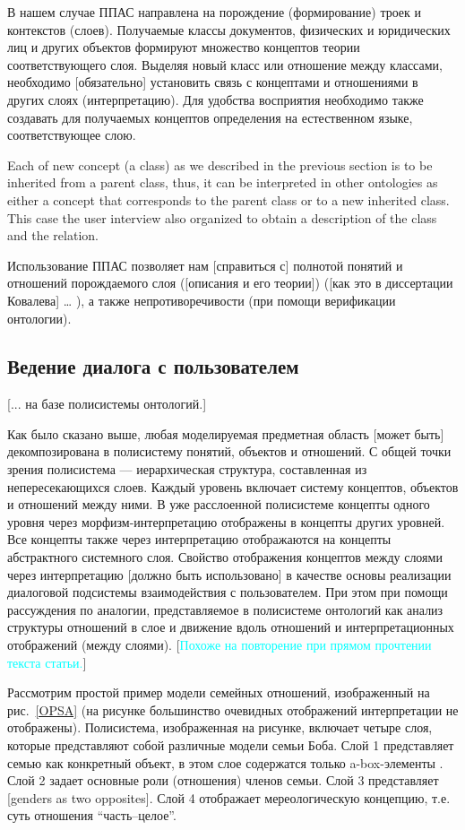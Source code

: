 \documentclass[utf8]{../IncArticle}
\newcommand{\e}[2][fcolor]{\textcolor{pcolor}{[}\textcolor{#1}{#2}\textcolor{pcolor}{]}}
\begin{document}
В нашем случае ППАС направлена на порождение (формирование) троек и
контекстов (слоев).  Получаемые классы документов, физических и
юридических лиц и других объектов формируют множество концептов
теории соответствующего слоя.  Выделяя новый класс или отношение между
классами, необходимо \e{обязательно} установить связь с концептами и отношениями в
других слоях (интерпретацию).  Для удобства восприятия необходимо
также создавать для получаемых концептов определения на естественном
языке, соответствующее слою.

Each of new concept (a class) as we described in the previous section
is to be inherited from a parent class, thus, it can be interpreted in
other ontologies as either a concept that corresponds to the parent
class or to a new inherited class.  This case the user interview also
organized to obtain a description of the class and the relation.

Использование ППАС позволяет нам \e{справиться с} полнотой понятий и отношений
порождаемого слоя (\e{описания и его теории}) (\e{как это в диссертации Ковалева}
\ldots{} \cite{sergey}), а также непротиворечивости (при помощи
верификации онтологии).

\subsection{Ведение диалога с пользователем}

\e{... на базе полисистемы онтологий.}

Как было сказано выше, любая моделируемая предметная область \e{может
  быть} декомпозирована в полисистему понятий, объектов и отношений. С
общей точки зрения полисистема --- иерархическая структура,
составленная из непересекающихся слоев.  Каждый уровень включает
систему концептов, объектов и отношений между ними.  В уже
расслоенной полисистеме концепты одного уровня через
морфизм-интерпретацию отображены в концепты других уровней.  Все
концепты также через интерпретацию отображаются на концепты
абстрактного системного слоя.  Свойство отображения концептов между
слоями через интерпретацию \e{должно быть использовано} в качестве
основы реализации диалоговой подсистемы взаимодействия с
пользователем.  При этом при помощи рассуждения по аналогии,
представляемое в полисистеме онтологий как анализ структуры отношений
в слое и движение вдоль отношений и интерпретационных отображений
(между слоями).  \e[cyan]{Похоже на повторение при прямом прочтении
  текста статьи.}

Рассмотрим простой пример модели семейных отношений, изображенный на
рис.~\ref{OPSA} (на рисунке большинство очевидных отображений
интерпретации не отображены).  Полисистема, изображенная на рисунке,
включает четыре слоя, которые представляют собой различные модели
семьи Боба.  Слой 1 представляет семью как конкретный объект, в этом
слое содержатся только a-box-элементы \cite{abox}.  Слой 2 задает
основные роли (отношения) членов семьи. Слой 3 представляет \e{genders
  as two opposites}. Слой 4 отображает мереологическую концепцию,
т.е. суть отношения ``часть--целое''.
\end{document}
